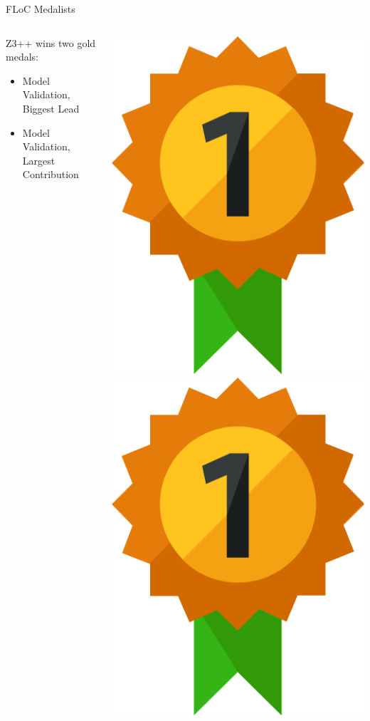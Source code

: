 \documentclass[table]{beamer}
\newcommand\vitem{\vfill\item}
\begin{document}
\begin{frame}{FLoC Medalists}

  \begin{columns}
    \begin{column}{0.6\textwidth}

  \Large Z3++ wins two gold medals:
  \begin{itemize}
    \bigskip
    \vitem Model Validation, Biggest Lead
    \bigskip

    \vitem Model Validation, Largest Contribution
  \end{itemize}
\end{column}
\hfill
\begin{column}{0.4\textwidth}
  \begin{center}
    \includegraphics[width=.3\textwidth]{medalgold}
    \includegraphics[width=.3\textwidth]{medalgold}
  \end{center}
\end{column}
\end{columns}

\end{frame}
\end{document}
